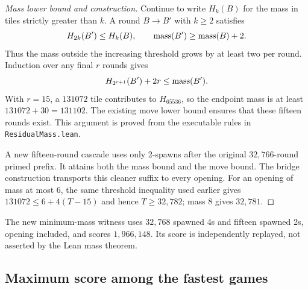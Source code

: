 \begin{proof}[Mass lower bound and construction]
Continue to write $H_k(B)$ for the mass in tiles strictly greater than
$k$. A round $B\to B'$ with $k\ge2$ satisfies
\[
 H_{2k}(B')\le H_k(B),\qquad \mathrm{mass}(B')\ge\mathrm{mass}(B)+2.
\]
Thus the mass outside the increasing threshold grows by at least two
per round. Induction over any final $r$ rounds gives
\[
 H_{2^{r+1}}(B')+2r\le\mathrm{mass}(B').
\]
With $r=15$, a $131072$ tile contributes to $H_{65536}$, so the endpoint
mass is at least $131072+30=131102$. The existing move lower bound
ensures that these fifteen rounds exist. This argument is proved from
the executable rules in \texttt{ResidualMass.lean}.

A new fifteen-round cascade uses only 2-spawns after the original
$32{,}766$-round primed prefix. It attains both the mass bound and the
move bound. The bridge construction transports this cleaner suffix to
every opening. For an opening of mass at most 6, the same threshold
inequality used earlier gives $131072\le6+4(T-15)$ and hence
$T\ge32{,}782$; mass 8 gives $32{,}781$.
\end{proof}

The new minimum-mass witness uses $32{,}768$ spawned 4s and fifteen
spawned 2s, opening included, and scores $1{,}966{,}148$. Its score is
independently replayed, not asserted by the Lean mass theorem.

\subsection{Maximum score among the fastest games}

